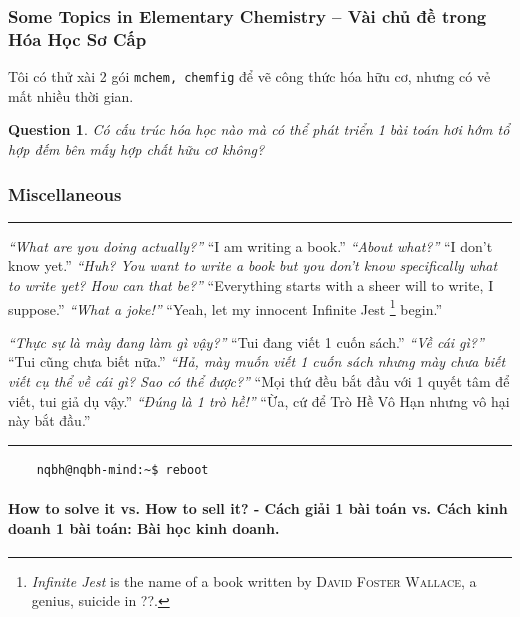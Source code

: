 \documentclass[12pt]{article}
\newtheorem{question}{Question}
\begin{document}
\subsubsection{Some Topics in Elementary Chemistry -- Vài chủ đề trong Hóa Học Sơ Cấp}
Tôi có thử xài 2 gói {\tt mchem, chemfig} để vẽ công thức hóa hữu cơ, nhưng có vẻ mất nhiều thời gian.

\begin{question}
	Có cấu trúc hóa học nào mà có thể phát triển 1 bài toán hơi hớm tổ hợp đếm bên mấy hợp chất hữu cơ không?
\end{question}


\subsubsection{Miscellaneous}
\hrule
\begin{multicols}{2}\small
	{\it ``What are you doing actually?''} ``I am writing a book.'' {\it ``About what?''} ``I don't know yet.'' {\it ``Huh? You want to write a book but you don't know specifically what to write yet? How can that be?''} ``Everything starts with a sheer will to write, I suppose.'' {\it ``What a joke!''} ``Yeah, let my innocent Infinite Jest \footnote{{\it Infinite Jest} is the name of a book written by \textsc{David Foster Wallace}, a genius, suicide in ??.} begin.''
	\columnbreak
	
	{\it ``Thực sự là mày đang làm gì vậy?''} ``Tui đang viết 1 cuốn sách.'' {\it ``Về cái gì?''} ``Tui cũng chưa biết nữa.'' {\it ``Hả, mày muốn viết 1 cuốn sách nhưng mày chưa biết viết cụ thể về cái gì? Sao có thể được?''} ``Mọi thứ đều bắt đầu với 1 quyết tâm để viết, tui giả dụ vậy.'' {\it ``Đúng là 1 trò hề!''} ``Ừa, cứ để Trò Hề Vô Hạn nhưng vô hại này bắt đầu.''	
\end{multicols}
\hrule
\noindent
\begin{verbatim}
	nqbh@nqbh-mind:~$ reboot
\end{verbatim}

\paragraph{How to solve it vs. How to sell it? - Cách giải 1 bài toán vs. Cách kinh doanh 1 bài toán: Bài học kinh doanh.}
	
\end{document}
